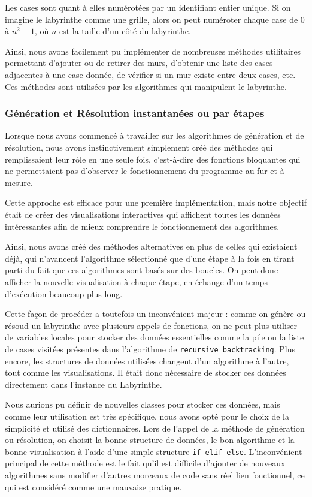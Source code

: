 \documentclass[12pt]{scrreprt} %
\begin{document}
Les cases sont quant à elles numérotées par un identifiant entier unique. Si on imagine le labyrinthe comme une grille, alors on peut numéroter chaque case de $0$ à $n^2 - 1$, où $n$ est la taille d'un côté du labyrinthe.

Ainsi, nous avons facilement pu implémenter de nombreuses méthodes utilitaires permettant d'ajouter ou de retirer des murs, d'obtenir une liste des cases adjacentes à une case donnée, de vérifier si un mur existe entre deux cases, etc. Ces méthodes sont utilisées par les algorithmes qui manipulent le labyrinthe.

\subsubsection{Génération et Résolution instantanées ou par étapes}

Lorsque nous avons commencé à travailler sur les algorithmes de génération et de résolution, nous avons instinctivement simplement créé des méthodes qui remplissaient leur rôle en une seule fois, c'est-à-dire des fonctions bloquantes qui ne permettaient pas d'observer le fonctionnement du programme au fur et à mesure.

Cette approche est efficace pour une première implémentation, mais notre objectif était de créer des visualisations interactives qui affichent toutes les données intéressantes afin de mieux comprendre le fonctionnement des algorithmes.

Ainsi, nous avons créé des méthodes alternatives en plus de celles qui existaient déjà, qui n'avancent l'algorithme sélectionné que d'une étape à la fois en tirant parti du fait que ces algorithmes sont basés sur des boucles. On peut donc afficher la nouvelle visualisation à chaque étape, en échange d'un temps d'exécution beaucoup plus long.

Cette façon de procéder a toutefois un inconvénient majeur : comme on génère ou résoud un labyrinthe avec plusieurs appels de fonctions, on ne peut plus utiliser de variables locales pour stocker des données essentielles comme la pile ou la liste de cases visitées présentes dans l'algorithme de \texttt{recursive backtracking}. Plus encore, les structures de données utilisées changent d'un algorithme à l'autre, tout comme les visualisations. Il était donc nécessaire de stocker ces données directement dans l'instance du Labyrinthe.

Nous aurions pu définir de nouvelles classes pour stocker ces données, mais comme leur utilisation est très spécifique, nous avons opté pour le choix de la simplicité et utilisé des dictionnaires. Lors de l'appel de la méthode de génération ou résolution, on choisit la bonne structure de données, le bon algorithme et la bonne visualisation à l'aide d'une simple structure \texttt{if-elif-else}. L'inconvénient principal de cette méthode est le fait qu'il est difficile d'ajouter de nouveaux algorithmes sans modifier d'autres morceaux de code sans réel lien fonctionnel, ce qui est considéré comme une mauvaise pratique.
\end{document}
